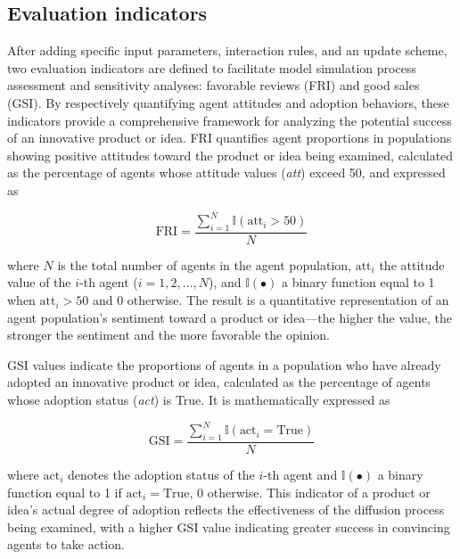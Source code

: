 \documentclass[10pt,letterpaper]{article}
\begin{document}
\subsection*{Evaluation indicators}

After adding specific input parameters, interaction rules, and an update scheme, two evaluation indicators are defined to facilitate model simulation process assessment and sensitivity analyses: favorable reviews (FRI) and good sales (GSI). By respectively quantifying agent attitudes and adoption behaviors, these indicators provide a comprehensive framework for analyzing the potential success of an innovative product or idea. FRI quantifies agent proportions in populations showing positive attitudes toward the product or idea being examined, calculated as the percentage of agents whose attitude values (\textit{att}) exceed 50, and expressed as

\begin{equation}
\label{eq:fri}
\text{FRI} = \frac{\sum_{i=1}^{N} \mathbb{I}(\text{att}_{i} > 50)}{N}
\end{equation}

\noindent where $N$ is the total number of agents in the agent population, $\text{att}_{i}$ the attitude value of the $i$-th agent ($i = 1, 2, \ldots, N$), and $\mathbb{I}(\bullet)$ a binary function equal to 1 when $\text{att}_{i} > 50$ and 0 otherwise. The result is a quantitative representation of an agent population's sentiment toward a product or idea---the higher the value, the stronger the sentiment and the more favorable the opinion.

GSI values indicate the proportions of agents in a population who have already adopted an innovative product or idea, calculated as the percentage of agents whose adoption status (\textit{act}) is True. It is mathematically expressed as

\begin{equation}
\label{eq:gsi}
\text{GSI} = \frac{\sum_{i=1}^{N} \mathbb{I}(\text{act}_{i} = \text{True})}{N}
\end{equation}

\noindent where $\text{act}_{i}$ denotes the adoption status of the $i$-th agent and $\mathbb{I}(\bullet)$ a binary function equal to 1 if $\text{act}_{i} = \text{True}$, 0 otherwise. This indicator of a product or idea's actual degree of adoption reflects the effectiveness of the diffusion process being examined, with a higher GSI value indicating greater success in convincing agents to take action.
\end{document}
